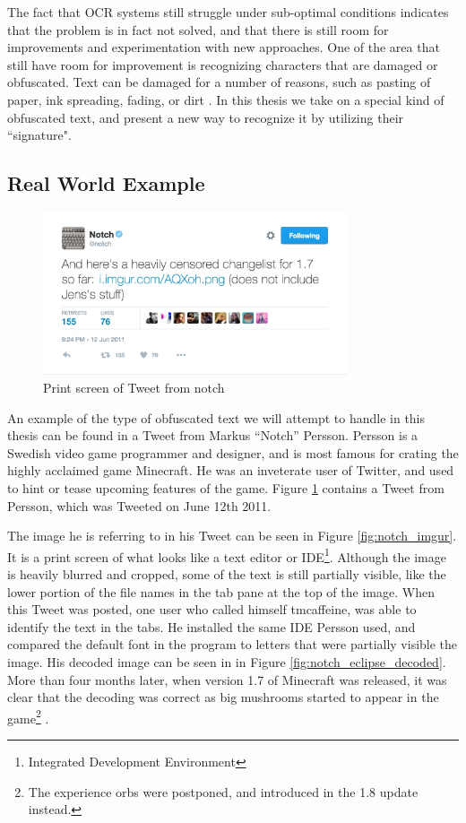 The fact that OCR systems still struggle under sub-optimal conditions indicates that the problem is in fact not solved, and that there is still room for improvements and experimentation with new approaches. One of the area that still have room for improvement is recognizing characters that are damaged or obfuscated. Text can be damaged for a number of reasons, such as pasting of paper, ink spreading, fading, or dirt \citep{bhardwaj2014imaging}. In this thesis we take on a special kind of obfuscated text, and present a new way to recognize it by utilizing their ``signature".

\subsection{Real World Example}
\begin{figure}[ht]
    \centering
    \includegraphics[width=0.8\textwidth]{fig/chapter1/notch_tweet.png}
    \caption[Print screen of Tweet from notch]{Print screen of Tweet from notch}
    \label{ref:notch_twitter}
\end{figure}

An example of the type of obfuscated text we will attempt to handle in this thesis can be found in a Tweet from Markus ``Notch'' Persson. Persson is a Swedish video game programmer and designer, and is most famous for crating the highly acclaimed game Minecraft. He was an inveterate user of Twitter, and used to hint or tease upcoming features of the game. Figure \ref{ref:notch_twitter} contains a Tweet from Persson, which was Tweeted on June 12th 2011.

The image he is referring to in his Tweet can be seen in Figure \ref{fig:notch_imgur}. It is a print screen of what looks like a text editor or IDE\footnote{Integrated Development Environment}. Although the image is heavily blurred and cropped, some of the text is still partially visible, like the lower portion of the file names in the tab pane at the top of the image. When this Tweet was posted, one user who called himself tmcaffeine, was able to identify the text in the tabs. He installed the same IDE Persson used, and compared the default font in the program to letters that were partially visible the image. His decoded image can be seen in in Figure \ref{fig:notch_eclipse_decoded}. More than four months later, when version 1.7 of Minecraft was released, it was clear that the decoding was correct as big mushrooms started to appear in the game\footnote{The experience orbs were postponed, and introduced in the 1.8 update instead.} \citep{misc-minecraft.172-changelog}.

